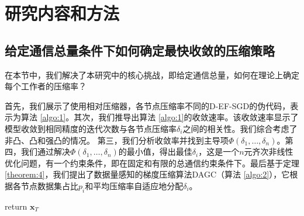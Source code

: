 
\chapter{研究内容和方法}

\section{给定通信总量条件下如何确定最快收敛的压缩策略}

在本节中，我们解决了本研究中的核心挑战，即给定通信总量，如何在理论上确定每个工作者的压缩率？

首先，我们展示了使用相对压缩器，各节点压缩率不同的D-EF-SGD的伪代码，表示为算法 \ref{algo:1}。其次，我们推导出算法 \ref{algo:1}的收敛速率。该收敛速率显示了模型收敛到相同精度的迭代次数与各节点压缩率$\delta_i$之间的相关性。我们综合考虑了非凸、凸和强凸的情况。%
第三，我们分析收敛率并找到主导项$\Phi(\delta_1,\ldots,\delta_n)$。第四，我们通过解决$\Phi(\delta_1,\ldots,\delta_n)$的最小值，得出最佳$\delta_i$，这是一个$n$元齐次非线性优化问题，有一个约束条件，即在固定和有限的总通信约束条件下。最后基于定理 \ref{theorem:4}，我们提出了数据量感知的梯度压缩算法DAGC（算法 \ref{algo:2}），它根据各节点数据集占比$p_i$和平均压缩率自适应地分配$\delta_i$。

\begin{algorithm}[t]
    \SetAlgoLined %
	\caption{使用相对压缩器，各节点压缩率不同的D-EF-SGD}%
	\label{algo:1}
	return $\textbf{x}_T$\;
\end{algorithm}

